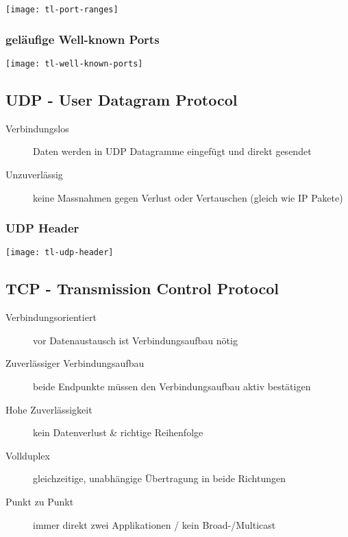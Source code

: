 \begin{center}
    \texttt{[image: tl-port-ranges]}
\end{center}

\subsubsection{geläufige Well-known Ports}

\begin{center}
    \texttt{[image: tl-well-known-ports]}
\end{center}



\subsection{UDP - User Datagram Protocol}

\begin{description}
    \item[Verbindungslos] Daten werden in UDP Datagramme eingefügt und direkt gesendet
    \item[Unzuverlässig] keine Massnahmen gegen Verlust oder Vertauschen
        (gleich wie IP Pakete)
\end{description}

\subsubsection{UDP Header}
\begin{center}
    \texttt{[image: tl-udp-header]}
\end{center}



\subsection{TCP - Transmission Control Protocol}

\begin{description}
    \item[Verbindungsorientiert] vor Datenaustausch ist Verbindungsaufbau nötig
    \item[Zuverlässiger Verbindungsaufbau] beide Endpunkte müssen den Verbindungsaufbau
        aktiv bestätigen
    \item[Hohe Zuverlässigkeit] kein Datenverlust \& richtige Reihenfolge
    \item[Vollduplex] gleichzeitige, unabhängige Übertragung in beide Richtungen
    \item[Punkt zu Punkt] immer direkt zwei Applikationen / kein Broad-/Multicast
\end{description}

